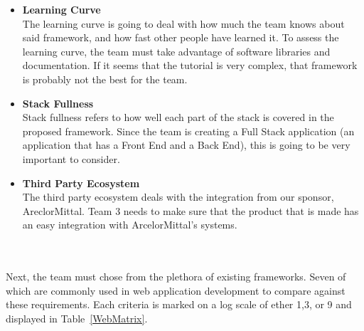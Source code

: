 \documentclass[Letter,11pt]{article}
\begin{document}
		\begin{minipage}[t]{0.5\textwidth}
		\begin{itemize}
			\item \textbf{Learning Curve} \\
			The learning curve is going to deal with how much the team knows about said framework, and how fast other people have learned it. To assess the learning curve, the team must take advantage of software libraries and documentation. If it seems that the tutorial is very complex, that framework is probably not the best for the team. 


			\item \textbf{Stack Fullness} \\
			Stack fullness refers to how well each part of the stack is covered in the proposed framework. Since the team is creating a Full Stack application (an application that has a Front End and a Back End), this is going to be very important to consider.

			\item \textbf{Third Party Ecosystem}\\
			The third party ecosystem deals with the integration from our sponsor, AreclorMittal. Team 3 needs to make sure that the product that is made has an easy integration with ArcelorMittal's systems. 
			
		\end{itemize}
		\end{minipage}\\
		\\

		Next, the team must chose from the plethora of existing frameworks. Seven of which are commonly used in web application development to compare against these requirements. Each criteria is marked on a log scale of ether 1,3, or 9 and displayed in Table~\ref{WebMatrix}.
		
\end{document}
